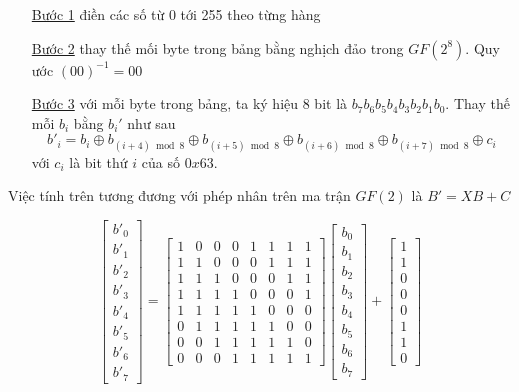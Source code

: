 \begin{itemize}
    \item [\underline{Bước 1}] điền các số từ 0 tới 255 theo từng hàng
    \item [\underline{Bước 2}] thay thế mối byte trong bảng bằng nghịch đảo trong $GF(2^8)$. Quy ước $(00)^{-1} = 00$
    \item [\underline{Bước 3}] với mỗi byte trong bảng, ta ký hiệu 8 bit là $b_7 b_6 b_5 b_4 b_3 b_2 b_1 b_0$. Thay thế mỗi $b_i$ bằng $b_i'$ như sau
    \[ b'_i = b_i \oplus b_{(i+4) \bmod 8} \oplus b_{(i+5) \bmod 8} \oplus b_{(i+6) \bmod 8} \oplus b_{(i+7) \bmod 8} \oplus c_i \]
    với $c_i$ là bit thứ $i$ của số $0x63$.
\end{itemize}

Việc tính trên tương đương với phép nhân trên ma trận $GF(2)$ là $B' = XB + C$

\[ \begin{bmatrix}
    b'_0 \\ b'_1 \\ b'_2 \\ b'_3 \\ b'_4 \\ b'_5 \\ b'_6 \\ b'_7
\end{bmatrix} = 
\begin{bmatrix}
    1 & 0 & 0 & 0 & 1 & 1 & 1 & 1 \\
    1 & 1 & 0 & 0 & 0 & 1 & 1 & 1 \\
    1 & 1 & 1 & 0 & 0 & 0 & 1 & 1 \\
    1 & 1 & 1 & 1 & 0 & 0 & 0 & 1 \\
    1 & 1 & 1 & 1 & 1 & 0 & 0 & 0 \\
    0 & 1 & 1 & 1 & 1 & 1 & 0 & 0 \\
    0 & 0 & 1 & 1 & 1 & 1 & 1 & 0 \\
    0 & 0 & 0 & 1 & 1 & 1 & 1 & 1
\end{bmatrix} 
\begin{bmatrix}
    b_0 \\ b_1 \\ b_2 \\ b_3 \\ b_4 \\ b_5 \\ b_6 \\ b_7
\end{bmatrix} + 
\begin{bmatrix}
    1 \\ 1 \\ 0 \\ 0 \\ 0 \\ 1 \\ 1 \\ 0
\end{bmatrix}\]

